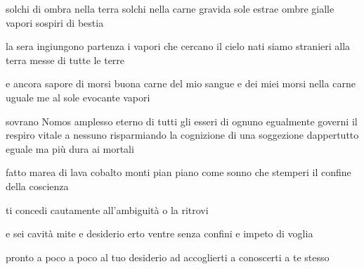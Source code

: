 \begin{poem}
	\begin{stanza}
		solchi di ombra nella terra\verseline
		solchi nella carne gravida\verseline
		sole estrae ombre gialle\verseline
		vapori sospiri di bestia
	\end{stanza}

	\begin{stanza}
		la sera ingiungono partenza\verseline
		i vapori che cercano il cielo\verseline
		nati siamo stranieri alla terra\verseline
		messe di tutte le terre
	\end{stanza}

	\begin{stanza}
		e ancora sapore di morsi\verseline
		buona carne del mio sangue\verseline
		e dei miei morsi nella carne\verseline
		uguale me al sole evocante vapori
	\end{stanza}
\end{poem}

\clearpage


\begin{poem}
	\begin{stanza}
		sovrano Nomos\verseline
		amplesso eterno di tutti gli esseri\verseline
		di ognuno egualmente governi il respiro vitale\verseline
		a nessuno risparmiando la cognizione\verseline
		di una soggezione dappertutto eguale\verseline
		ma più dura ai mortali
	\end{stanza}
\end{poem}

\clearpage


\begin{poem}
	\begin{stanza}
		fatto marea\verseline
		di lava cobalto\verseline
		monti pian piano\verseline
		come sonno che stemperi\verseline
		il confine della coscienza
	\end{stanza}

	\begin{stanza}
		ti concedi\verseline
		cautamente\verseline
		all’ambiguità\verseline
		o la ritrovi
	\end{stanza}

	\begin{stanza}
		e sei cavità mite\verseline
		e desiderio erto\verseline
		ventre senza confini\verseline
		e impeto di voglia
	\end{stanza}

	\begin{stanza}
		pronto a poco a poco\verseline
		al tuo desiderio\verseline
		ad accoglierti\verseline
		a conoscerti\verseline
		a te stesso
	\end{stanza}
\end{poem}

